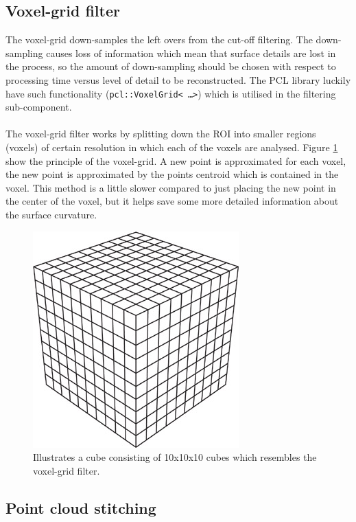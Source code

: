 \subsection{Voxel-grid filter}
The voxel-grid down-samples the left overs from the cut-off filtering. The down-sampling causes loss of information which mean that surface details are lost in the process, so the amount of down-sampling should be chosen with respect to processing time versus level of detail to be reconstructed. The PCL library luckily have such functionality (\texttt{pcl::VoxelGrid< \ldots >}) which is utilised in the filtering sub-component.\\
\\
The voxel-grid filter works by splitting down the ROI into smaller regions (voxels) of certain resolution in which each of the voxels are analysed. Figure \ref{fig:filtering_voxel_grid} show the principle of the voxel-grid. A new point is approximated for each voxel, the new point is approximated by the points centroid which is contained in the voxel. This method is a little slower compared to just placing the new point in the center of the voxel, but it helps save some more detailed information about the surface curvature.
\begin{figure}[htb]
	\begin{center}
		\includegraphics[scale=0.7,trim=0 0 0 0]{graphics/07_modelling/cube.jpg}%
		\caption{Illustrates a cube consisting of 10x10x10 cubes which resembles the voxel-grid filter.}
		\label{fig:filtering_voxel_grid}
	\end{center}
\end{figure}

\subsection{Point cloud stitching}

